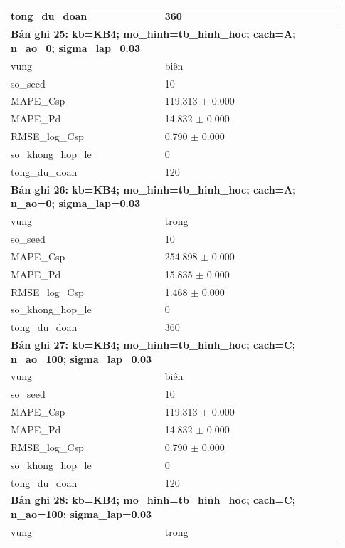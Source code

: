 \begin{longtable}{p{0.43\linewidth}p{0.50\linewidth}}
tong\_\allowbreak du\_\allowbreak doan & 360 \\
\midrule
\multicolumn{2}{p{0.95\linewidth}}{\textbf{Bản ghi 25: kb=KB4; mo\_hinh=tb\_hinh\_hoc; cach=A; n\_ao=0; sigma\_lap=0.03}} \\
vung & biên \\
so\_\allowbreak seed & 10 \\
MAPE\_\allowbreak Csp & 119.313 $\pm$ 0.000 \\
MAPE\_\allowbreak Pd & 14.832 $\pm$ 0.000 \\
RMSE\_\allowbreak log\_\allowbreak Csp & 0.790 $\pm$ 0.000 \\
so\_\allowbreak khong\_\allowbreak hop\_\allowbreak le & 0 \\
tong\_\allowbreak du\_\allowbreak doan & 120 \\
\midrule
\multicolumn{2}{p{0.95\linewidth}}{\textbf{Bản ghi 26: kb=KB4; mo\_hinh=tb\_hinh\_hoc; cach=A; n\_ao=0; sigma\_lap=0.03}} \\
vung & trong \\
so\_\allowbreak seed & 10 \\
MAPE\_\allowbreak Csp & 254.898 $\pm$ 0.000 \\
MAPE\_\allowbreak Pd & 15.835 $\pm$ 0.000 \\
RMSE\_\allowbreak log\_\allowbreak Csp & 1.468 $\pm$ 0.000 \\
so\_\allowbreak khong\_\allowbreak hop\_\allowbreak le & 0 \\
tong\_\allowbreak du\_\allowbreak doan & 360 \\
\midrule
\multicolumn{2}{p{0.95\linewidth}}{\textbf{Bản ghi 27: kb=KB4; mo\_hinh=tb\_hinh\_hoc; cach=C; n\_ao=100; sigma\_lap=0.03}} \\
vung & biên \\
so\_\allowbreak seed & 10 \\
MAPE\_\allowbreak Csp & 119.313 $\pm$ 0.000 \\
MAPE\_\allowbreak Pd & 14.832 $\pm$ 0.000 \\
RMSE\_\allowbreak log\_\allowbreak Csp & 0.790 $\pm$ 0.000 \\
so\_\allowbreak khong\_\allowbreak hop\_\allowbreak le & 0 \\
tong\_\allowbreak du\_\allowbreak doan & 120 \\
\midrule
\multicolumn{2}{p{0.95\linewidth}}{\textbf{Bản ghi 28: kb=KB4; mo\_hinh=tb\_hinh\_hoc; cach=C; n\_ao=100; sigma\_lap=0.03}} \\
vung & trong \\

\end{longtable}
